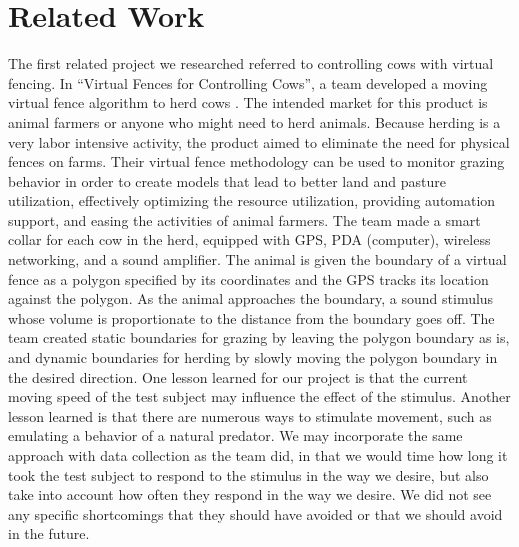 \documentclass{article}
\begin{document}
\section{Related Work}

\par The first related project we researched referred to controlling cows with virtual fencing. In ``Virtual Fences for Controlling Cows'', a team developed a moving virtual fence algorithm to herd cows \cite{butler2004virtual}. The intended market for this product is animal farmers or anyone who might need to herd animals. Because herding is a very labor intensive activity, the product aimed to eliminate the need for physical fences on farms. Their virtual fence methodology can be used to monitor grazing behavior in order to create models that lead to better land and pasture utilization, effectively optimizing the resource utilization, providing automation support, and easing the activities of animal farmers. The team made a smart collar for each cow in the herd, equipped with GPS, PDA (computer), wireless networking, and a sound amplifier. The animal is given the boundary of a virtual fence as a polygon specified by its coordinates and the GPS tracks its location against the polygon. As the animal approaches the boundary, a sound stimulus whose volume is proportionate to the distance from the boundary goes off. The team created static boundaries for grazing by leaving the polygon boundary as is, and dynamic boundaries for herding by slowly moving the polygon boundary in the desired direction. One lesson learned for our project is that the current moving speed of the test subject may influence the effect of the stimulus. Another lesson learned is that there are numerous ways to stimulate movement, such as emulating a behavior of a natural predator. We may incorporate the same approach with data collection as the team did, in that we would time how long it took the test subject to respond to the stimulus in the way we desire, but also take into account how often they respond in the way we desire. We did not see any specific shortcomings that they should have avoided or that we should avoid in the future. 

\bigskip
\end{document}
